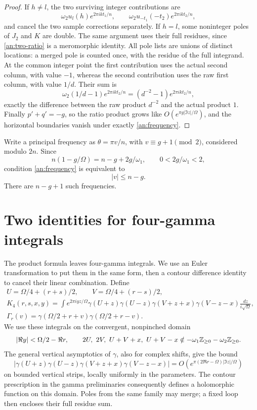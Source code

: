 \begin{proof}
If $h\ne l$, the two surviving integer contributions are
\[
 \omega_2 u_l(h)e^{2\pi ikt_1/n},\qquad
 \omega_2 u_{-t_1}(-t_2)e^{2\pi ikt_2/n},
\]
and cancel the two sample corrections separately.  If $h=l$, some noninteger
poles of $J_2$ and $K$ are double.  The same argument uses their
full residues, since \eqref{an:two-ratio} is a meromorphic identity.
All pole lists are unions of distinct locations: a merged pole is
counted once, with the residue of the full integrand.
At the common integer point the first contribution uses the actual
second column, with value $-1$, whereas the second contribution
uses the raw first column, with value $1/d$.  Their sum is
\[
 \omega_2(1/d-1)e^{2\pi ikt_2/n}=(d^{-2}-1)e^{2\pi ikt_2/n},
\]
exactly the difference between the raw product $d^{-2}$ and the
actual product $1$.  Finally $p'+q'=-g$, so the ratio product grows like
$O(e^{\pi g|\Im z|/\Omega})$, and the horizontal boundaries vanish
under exactly \eqref{an:frequency}.
\end{proof}

Write a principal frequency as $\theta=\pi v/n$, with
$v\equiv g+1\pmod2$, considered modulo $2n$.  Since
\[
 n(1-g/\Omega)=n-g+2g/\omega_1,\qquad 0<2g/\omega_1<2,
\]
condition \eqref{an:frequency} is equivalent to
\begin{equation}
 |v|\le n-g.
 \label{an:restricted-set}
\end{equation}
There are $n-g+1$ such frequencies.

\section{Two identities for four-gamma integrals}
\label{an:euler-section}

The product formula leaves four-gamma integrals.  We use an Euler
transformation to put them in the same form, then a contour difference
identity to cancel their linear combination.  Define
\begin{gather*}
 U=\Omega/4+(r+s)/2,\qquad V=\Omega/4+(r-s)/2,\\
 K_4(r,s,x,y)=\int e^{2\pi iyz/\Omega}
       \gamma(U+z)\gamma(U-z)
       \gamma(V+z+x)\gamma(V-z-x)\frac{dz}{i\sqrt\Omega},\\
 \Gamma_r(v)=\gamma(\Omega/2+r+v)\gamma(\Omega/2+r-v).
\end{gather*}
We use these integrals on the convergent, nonpinched domain
\[
 |\Re y|<\Omega/2-\Re r,\qquad
 2U,\ 2V,\ U+V+x,\ U+V-x
       \notin-\omega_1\mathbb Z_{\ge0}-\omega_2\mathbb Z_{\ge0}.
\]
The general vertical asymptotics of $\gamma$, also for complex shifts,
give the bound
\[
 \left|\gamma(U+z)\gamma(U-z)
          \gamma(V+z+x)\gamma(V-z-x)\right|
 =O\!\left(e^{\pi(2\Re r-\Omega)|\Im z|/\Omega}\right)
\]
on bounded vertical strips, locally uniformly in the parameters.
The contour prescription in the gamma preliminaries consequently
defines a holomorphic function on this domain.  Poles from the same
family may merge; a fixed loop then encloses their full residue sum.

